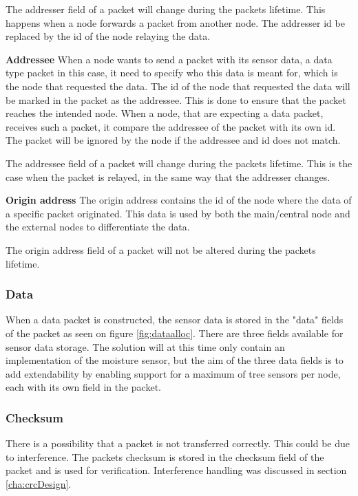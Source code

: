 The addresser field of a packet will change during the packets lifetime. This happens when a node forwards a packet from another node. The addresser id be replaced by the id of the node relaying the data.

\textbf{Addressee}\newline
When a node wants to send a packet with its sensor data, a data type packet in this case, it need to specify who this data is meant for, which is the node that requested the data. The id of the node that requested the data will be marked in the packet as the addressee. This is done to ensure that the packet reaches the intended node. When a node, that are expecting a data packet, receives such a packet, it compare the addressee of the packet with its own id. The packet will be ignored by the node if the addressee and id does not match.

The addressee field of a packet will change during the packets lifetime. This is the case when the packet is relayed, in the same way that the addresser changes.

\textbf{Origin address}\newline
The origin address contains the id of the node where the data of a specific packet originated. This data is used by both the main/central node and the external nodes to differentiate the data.

The origin address field of a packet will not be altered during the packets lifetime.


\subsubsection{Data}
When a data packet is constructed, the sensor data is stored in the "data" fields of the packet as seen on figure \ref{fig:dataalloc}. There are three fields available for sensor data storage. The solution will at this time only contain an implementation of the moisture sensor, but the aim of the three data fields is to add extendability by enabling support for a maximum of tree sensors per node, each with its own field in the packet.


\subsubsection{Checksum}
There is a possibility that a packet is not transferred correctly. This could be due to interference. The packets checksum is stored in the checksum field of the packet and is used for verification. Interference handling was discussed in section \ref{cha:crcDesign}.


